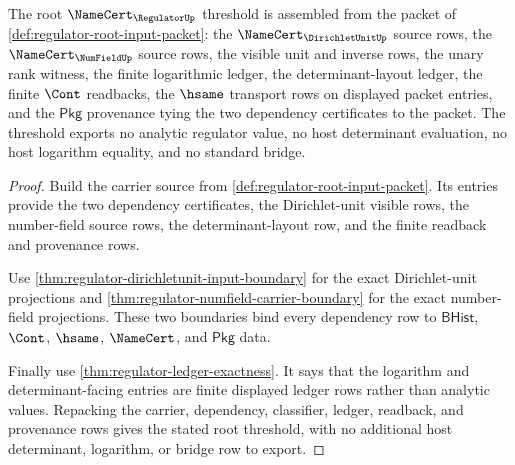 \begin{theorem}
\label{thm:regulator-root-namecert-threshold}
The root $\NameCert_{\RegulatorUp}$ threshold is assembled from the packet of
\autoref{def:regulator-root-input-packet}: the
$\NameCert_{\DirichletUnitUp}$ source rows, the $\NameCert_{\NumFieldUp}$ source
rows, the visible unit and inverse rows, the unary rank witness, the finite
logarithmic ledger, the determinant-layout ledger, the finite $\Cont$
readbacks, the $\hsame$ transport rows on displayed packet entries, and the
$\mathsf{Pkg}$ provenance tying the two dependency certificates to the packet.
The threshold exports no analytic regulator value, no host determinant
evaluation, no host logarithm equality, and no standard bridge.
\end{theorem}
\begin{proof}
Build the carrier source from \autoref{def:regulator-root-input-packet}. Its
entries provide the two dependency certificates, the Dirichlet-unit visible
rows, the number-field source rows, the determinant-layout row, and the finite
readback and provenance rows.

Use \autoref{thm:regulator-dirichletunit-input-boundary} for the exact
Dirichlet-unit projections and
\autoref{thm:regulator-numfield-carrier-boundary} for the exact number-field
projections. These two boundaries bind every dependency row to
$\mathsf{BHist}$, $\Cont$, $\hsame$, $\NameCert$, and $\mathsf{Pkg}$ data.

Finally use \autoref{thm:regulator-ledger-exactness}. It says that the
logarithm and determinant-facing entries are finite displayed ledger rows
rather than analytic values. Repacking the carrier, dependency, classifier,
ledger, readback, and provenance rows gives the stated root threshold, with no
additional host determinant, logarithm, or bridge row to export.
\end{proof}

